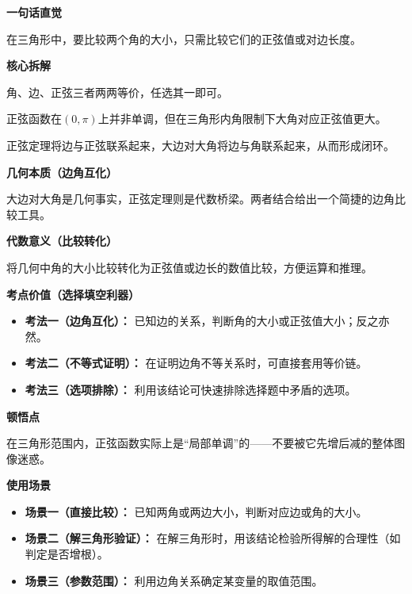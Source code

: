 \begin{explanationbox}
	\textbf{\textcolor{CExplanation}{一句话直觉}}

	在三角形中，要比较两个角的大小，只需比较它们的正弦值或对边长度。

	\medskip
	\textbf{\textcolor{CExplanation}{核心拆解}}
	\begin{description}[style=nextline, leftmargin=2.8em, labelsep=0.5em, itemsep=0.45em]
		\item[\textbf{要点一（三向等价）：}] 角、边、正弦三者两两等价，任选其一即可。
		\item[\textbf{要点二（单调性陷阱）：}] 正弦函数在$(0,\pi)$上并非单调，但在三角形内角限制下大角对应正弦值更大。
		\item[\textbf{要点三（定理桥梁）：}] 正弦定理将边与正弦联系起来，大边对大角将边与角联系起来，从而形成闭环。
	\end{description}

	\medskip
	\textbf{\textcolor{CExplanation}{几何本质（边角互化）}}

	大边对大角是几何事实，正弦定理则是代数桥梁。两者结合给出一个简捷的边角比较工具。

	\medskip
	\textbf{\textcolor{CExplanation}{代数意义（比较转化）}}

	将几何中角的大小比较转化为正弦值或边长的数值比较，方便运算和推理。

	\medskip
	\textbf{\textcolor{CExplanation}{考点价值（选择填空利器）}}
	\begin{itemize}[leftmargin=*, itemsep=0.5em, topsep=0.4em]
		\item \textbf{考法一（边角互化）：} 已知边的关系，判断角的大小或正弦值大小；反之亦然。
		\item \textbf{考法二（不等式证明）：} 在证明边角不等关系时，可直接套用等价链。
		\item \textbf{考法三（选项排除）：} 利用该结论可快速排除选择题中矛盾的选项。
	\end{itemize}

	\medskip
	\textbf{\textcolor{CExplanation}{顿悟点}}

	在三角形范围内，正弦函数实际上是“局部单调”的——不要被它先增后减的整体图像迷惑。

	\medskip
	\textbf{\textcolor{CExplanation}{使用场景}}
	\begin{itemize}[leftmargin=*, itemsep=0.5em, topsep=0.4em]
		\item \textbf{场景一（直接比较）：} 已知两角或两边大小，判断对应边或角的大小。
		\item \textbf{场景二（解三角形验证）：} 在解三角形时，用该结论检验所得解的合理性（如判定是否增根）。
		\item \textbf{场景三（参数范围）：} 利用边角关系确定某变量的取值范围。
	\end{itemize}
\end{explanationbox}

